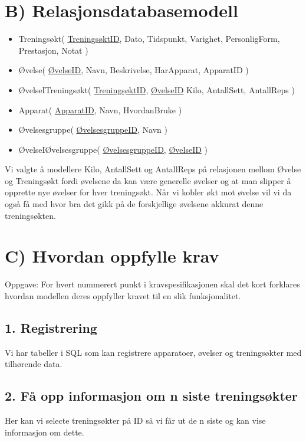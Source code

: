 \documentclass[11pt]{article}
\begin{document}
\section*{B) Relasjonsdatabasemodell}
\label{sec:org2d67107}
\begin{itemize}
\item Treningsøkt( \uline{TreningsøktID}, Dato, Tidspunkt, Varighet, PersonligForm, Prestasjon, Notat )\\
\item Øvelse( \uline{ØvelseID}, Navn, Beskrivelse, HarApparat, ApparatID )\\
\item ØvelseITreningsøkt( \uline{TreningsøktID}, \uline{ØvelseID} Kilo, AntallSett, AntallReps )\\
\item Apparat( \uline{ApparatID}, Navn, HvordanBruke )\\
\item Øvelsesgruppe( \uline{ØvelsesgruppeID}, Navn )\\
\item ØvelseIØvelsesgruppe( \uline{ØvelsesgruppeID}, \uline{ØvelseID} )\\
\end{itemize}

Vi valgte å modellere Kilo, AntallSett og AntallReps på relasjonen mellom Øvelse og Treningsøkt fordi øvelsene da kan være generelle øvelser og at man slipper å opprette nye øvelser for hver treningsøkt. Når vi kobler økt mot øvelse vil vi da også få med hvor bra det gikk på de forskjellige øvelsene akkurat denne treningsøkten.\\

\section*{C) Hvordan oppfylle krav}
\label{sec:org6912393}
Oppgave: For hvert nummerert punkt i kravspesifikasjonen skal det kort forklares hvordan modellen deres oppfyller kravet til en slik funksjonalitet.\\
\subsection*{1. Registrering}
\label{sec:org48ae982}
Vi har tabeller i SQL som kan registrere apparatoer, øvelser og treningsøkter med tilhørende data.\\
\subsection*{2. Få opp informasjon om n siste treningsøkter}
\label{sec:orgd04294e}
Her kan vi selecte treningsøkter på ID så vi får ut de n siste og kan vise informasjon om dette.\\
\end{document}
